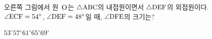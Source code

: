 \noindent\begin{minipage}[t]{0.58\linewidth}\vspace{0pt}\raggedright 오른쪽 그림에서 원~$\mathrm{O}$는 $\triangle\mathrm{ABC}$의 내접원이면서 $\triangle\mathrm{DEF}$의 외접원이다. $\angle\mathrm{ECF}=54^\circ$, $\angle\mathrm{DEF}=48^\circ$일 때, $\angle\mathrm{DFE}$의 크기는?\end{minipage}\hfill\begin{minipage}[t]{0.4\linewidth}\vspace{0pt}\centering \resizebox{\ifdim\width>\linewidth\linewidth\else\width\fi}{!}{}\end{minipage}\par
\begin{choices32}{$53^\circ$}{$57^\circ$}{$61^\circ$}{$65^\circ$}{$69^\circ$}\end{choices32}
